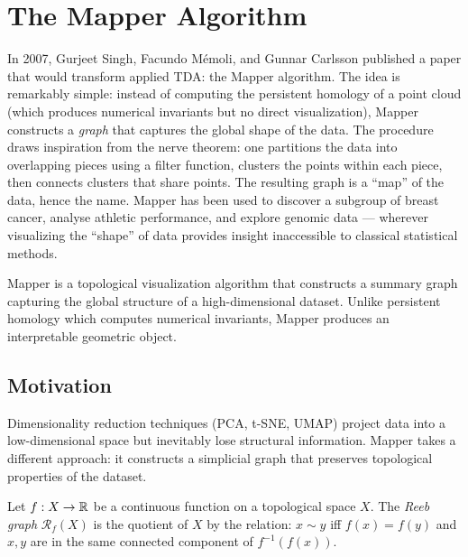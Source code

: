 \chapter{The Mapper Algorithm}
\label{ch:mapper}

In 2007, Gurjeet Singh, Facundo M\'emoli, and Gunnar Carlsson published a paper that would transform applied TDA: the Mapper algorithm. The idea is remarkably simple: instead of computing the persistent homology of a point cloud (which produces numerical invariants but no direct visualization), Mapper constructs a \emph{graph} that captures the global shape of the data. The procedure draws inspiration from the nerve theorem: one partitions the data into overlapping pieces using a filter function, clusters the points within each piece, then connects clusters that share points. The resulting graph is a ``map'' of the data, hence the name. Mapper has been used to discover a subgroup of breast cancer, analyse athletic performance, and explore genomic data --- wherever visualizing the ``shape'' of data provides insight inaccessible to classical statistical methods.

\begin{intuition}
Mapper is a topological visualization algorithm that constructs a
summary graph capturing the global structure of a high-dimensional
dataset. Unlike persistent homology which computes numerical invariants,
Mapper produces an interpretable geometric object.
\end{intuition}

\section{Motivation}

Dimensionality reduction techniques (PCA, t-SNE, UMAP) project data
into a low-dimensional space but inevitably lose structural information.
Mapper takes a different approach: it constructs a simplicial graph that
preserves topological properties of the dataset.

\begin{definition}
Let $f : X \to \mathbb{R}$ be a continuous function on a topological space $X$.
The \emph{Reeb graph} $\mathcal{R}_f(X)$ is the quotient of $X$ by the
relation: $x \sim y$ iff $f(x) = f(y)$ and $x, y$ are in the same
connected component of $f^{-1}(f(x))$.
\end{definition}

